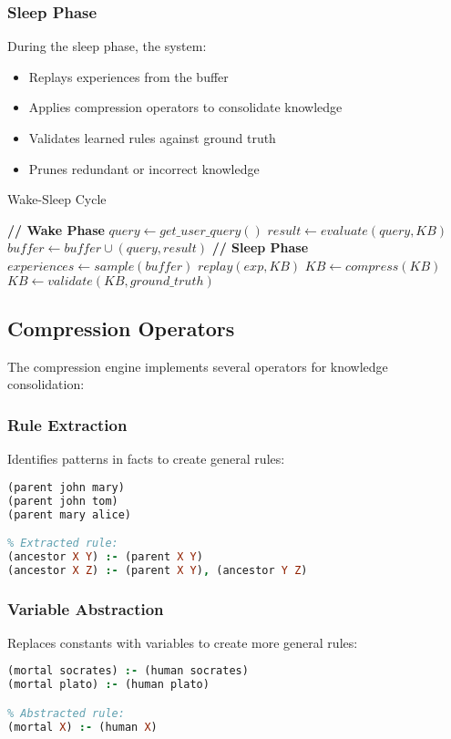 \documentclass[10pt,conference]{IEEEtran}
\begin{document}
\subsubsection{Sleep Phase}
During the sleep phase, the system:
\begin{itemize}
\item Replays experiences from the buffer
\item Applies compression operators to consolidate knowledge
\item Validates learned rules against ground truth
\item Prunes redundant or incorrect knowledge
\end{itemize}

\begin{algorithm}
\caption{Wake-Sleep Cycle}
\label{alg:wake_sleep}
\begin{algorithmic}[1]
    \STATE \textbf{// Wake Phase}
        \STATE $query \gets get\_user\_query()$
        \STATE $result \gets evaluate(query, KB)$
        \STATE $buffer \gets buffer \cup (query, result)$
    \ENDFOR
    \STATE \textbf{// Sleep Phase}
    \STATE $experiences \gets sample(buffer)$
        \STATE $replay(exp, KB)$
    \ENDFOR
    \STATE $KB \gets compress(KB)$
    \STATE $KB \gets validate(KB, ground\_truth)$
\ENDWHILE
\end{algorithmic}
\end{algorithm}

\subsection{Compression Operators}

The compression engine implements several operators for knowledge consolidation:

\subsubsection{Rule Extraction}
Identifies patterns in facts to create general rules:
\begin{lstlisting}[language=Prolog]
% Facts:
(parent john mary)
(parent john tom)
(parent mary alice)

% Extracted rule:
(ancestor X Y) :- (parent X Y)
(ancestor X Z) :- (parent X Y), (ancestor Y Z)
\end{lstlisting}

\subsubsection{Variable Abstraction}
Replaces constants with variables to create more general rules:
\begin{lstlisting}[language=Prolog]
% Specific rules:
(mortal socrates) :- (human socrates)
(mortal plato) :- (human plato)

% Abstracted rule:
(mortal X) :- (human X)
\end{lstlisting}
\end{document}
